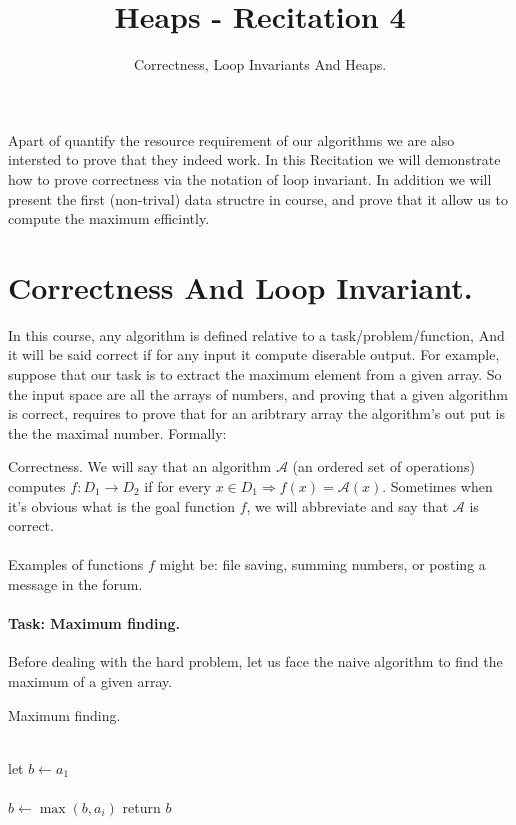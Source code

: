 \title{Heaps - Recitation 4} 
\author{Correctness, Loop Invariants And Heaps.}


  Apart of quantify the resource requirement of our algorithms we are also intersted to prove that they indeed work. In this Recitation we will demonstrate how to prove correctness via the notation of loop invariant. In addition we will present the first (non-trival) data structre in course, and prove that it allow us to compute the maximum efficintly.     
   


\section{Correctness And Loop Invariant.}
In this course, any algorithm is defined relative to a task/problem/function, And it will be said correct if for any input it compute diserable output. For example, suppose that our task is to extract the maximum element from a given array.
So the input space are all the arrays of numbers, and proving that a given algorithm is correct, requires to prove that for an aribtrary array the algorithm's out put is the the maximal number. Formally:  

\begin{defbox}{Correctness.}
We will say that an algorithm \( \mathcal{A}\) (an ordered set of operations) computes \( f:D_1 \rightarrow D_2 \) if for every \(x \in D_1 \Rightarrow f(x) = \mathcal{A}(x)\). Sometimes when it's obvious what is the goal function \(f\), we will abbreviate and say that \( \mathcal{A}\) is correct.       
\end{defbox}
\paragraph{}
Examples of functions \(f\) might be: file saving, summing numbers, or posting a message in the forum.  
\paragraph{Task: Maximum finding.} Before dealing with the hard problem, let us face the naive algorithm to find the maximum of a given array.

\begin{algbox}{Maximum finding.}
\begin{algorithm*}[H]
{}
 \ \\ 
 let \(b \leftarrow a_1 \) \\ 
 \ \\ 
  { 
        \(b \leftarrow \max \left(b, a_i \right) \)
    } 
 return \( b \) 
\end{algorithm*}
\end{algbox}


